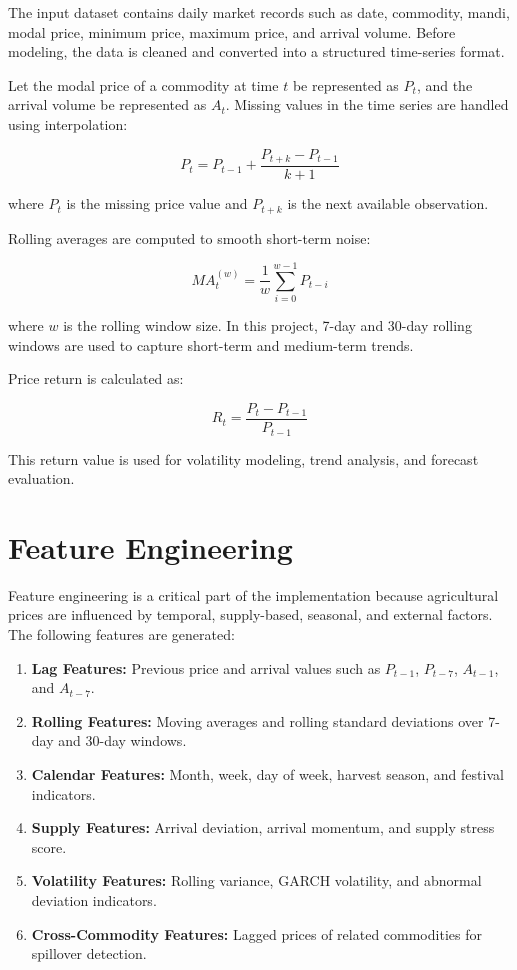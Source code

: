 \documentclass[12pt,a4paper]{report}
\begin{document}
The input dataset contains daily market records such as date, commodity, mandi, modal price, minimum price, maximum price, and arrival volume. Before modeling, the data is cleaned and converted into a structured time-series format.

Let the modal price of a commodity at time $t$ be represented as $P_t$, and the arrival volume be represented as $A_t$. Missing values in the time series are handled using interpolation:

\begin{equation}
P_t = P_{t-1} + \frac{P_{t+k} - P_{t-1}}{k+1}
\end{equation}

where $P_t$ is the missing price value and $P_{t+k}$ is the next available observation.

Rolling averages are computed to smooth short-term noise:

\begin{equation}
MA_t^{(w)} = \frac{1}{w} \sum_{i=0}^{w-1} P_{t-i}
\end{equation}

where $w$ is the rolling window size. In this project, 7-day and 30-day rolling windows are used to capture short-term and medium-term trends.

Price return is calculated as:

\begin{equation}
R_t = \frac{P_t - P_{t-1}}{P_{t-1}}
\end{equation}

This return value is used for volatility modeling, trend analysis, and forecast evaluation.

\section{Feature Engineering}

Feature engineering is a critical part of the implementation because agricultural prices are influenced by temporal, supply-based, seasonal, and external factors. The following features are generated:

\begin{enumerate}
    \item \textbf{Lag Features:} Previous price and arrival values such as $P_{t-1}$, $P_{t-7}$, $A_{t-1}$, and $A_{t-7}$.
    \item \textbf{Rolling Features:} Moving averages and rolling standard deviations over 7-day and 30-day windows.
    \item \textbf{Calendar Features:} Month, week, day of week, harvest season, and festival indicators.
    \item \textbf{Supply Features:} Arrival deviation, arrival momentum, and supply stress score.
    \item \textbf{Volatility Features:} Rolling variance, GARCH volatility, and abnormal deviation indicators.
    \item \textbf{Cross-Commodity Features:} Lagged prices of related commodities for spillover detection.
\end{enumerate}
\end{document}

